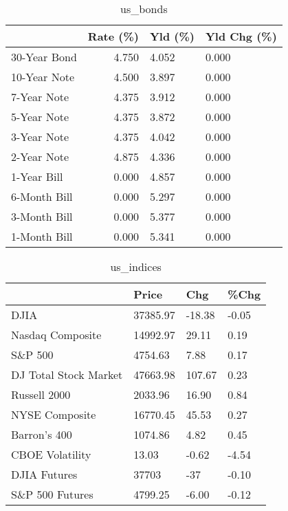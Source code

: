 \documentclass{article}%
\begin{document}
\begin{table}[htbp]%
\caption{us\_bonds}%
\centering%
\begin{adjustbox}{width=1\textwidth}%
\begin{tabular}{lrll}
\toprule
             &  Rate (\%) & Yld (\%) & Yld Chg (\%) \\
\midrule
30-Year Bond &     4.750 &   4.052 &       0.000 \\
10-Year Note &     4.500 &   3.897 &       0.000 \\
 7-Year Note &     4.375 &   3.912 &       0.000 \\
 5-Year Note &     4.375 &   3.872 &       0.000 \\
 3-Year Note &     4.375 &   4.042 &       0.000 \\
 2-Year Note &     4.875 &   4.336 &       0.000 \\
 1-Year Bill &     0.000 &   4.857 &       0.000 \\
6-Month Bill &     0.000 &   5.297 &       0.000 \\
3-Month Bill &     0.000 &   5.377 &       0.000 \\
1-Month Bill &     0.000 &   5.341 &       0.000 \\
\bottomrule
\end{tabular}
%
\end{adjustbox}%
\end{table}

%


\begin{table}[htbp]%
\caption{us\_indices}%
\centering%
\begin{adjustbox}{width=1\textwidth}%
\begin{tabular}{llll}
\toprule
                      &    Price &    Chg &  \%Chg \\
\midrule
                 DJIA & 37385.97 & -18.38 & -0.05 \\
     Nasdaq Composite & 14992.97 &  29.11 &  0.19 \\
              S\&P 500 &  4754.63 &   7.88 &  0.17 \\
DJ Total Stock Market & 47663.98 & 107.67 &  0.23 \\
         Russell 2000 &  2033.96 &  16.90 &  0.84 \\
       NYSE Composite & 16770.45 &  45.53 &  0.27 \\
         Barron's 400 &  1074.86 &   4.82 &  0.45 \\
      CBOE Volatility &    13.03 &  -0.62 & -4.54 \\
         DJIA Futures &    37703 &    -37 & -0.10 \\
      S\&P 500 Futures &  4799.25 &  -6.00 & -0.12 \\
\bottomrule
\end{tabular}
%
\end{adjustbox}%
\end{table}
\end{document}
